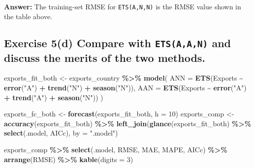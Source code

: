 \documentclass[
  11pt,
]{article}
\newenvironment{Shaded}{\begin{snugshade}}{\end{snugshade}}
\newcommand{\AttributeTok}[1]{\textcolor[rgb]{0.13,0.29,0.53}{#1}}
\newcommand{\DecValTok}[1]{\textcolor[rgb]{0.00,0.00,0.81}{#1}}
\newcommand{\FunctionTok}[1]{\textcolor[rgb]{0.13,0.29,0.53}{\textbf{#1}}}
\newcommand{\NormalTok}[1]{#1}
\newcommand{\OtherTok}[1]{\textcolor[rgb]{0.56,0.35,0.01}{#1}}
\newcommand{\SpecialCharTok}[1]{\textcolor[rgb]{0.81,0.36,0.00}{\textbf{#1}}}
\newcommand{\StringTok}[1]{\textcolor[rgb]{0.31,0.60,0.02}{#1}}
\begin{document}
\textbf{Answer:} The training-set RMSE for \texttt{ETS(A,N,N)} is the
RMSE value shown in the table above.

\subsection{\texorpdfstring{Exercise 5(d) Compare with
\texttt{ETS(A,A,N)} and discuss the merits of the two
methods.}{Exercise 5(d) Compare with ETS(A,A,N) and discuss the merits of the two methods.}}\label{exercise-5d-compare-with-etsaan-and-discuss-the-merits-of-the-two-methods.}

\begin{Shaded}
\begin{Highlighting}[]
\NormalTok{exports\_fit\_both }\OtherTok{\textless{}{-}}\NormalTok{ exports\_country }\SpecialCharTok{\%\textgreater{}\%}
  \FunctionTok{model}\NormalTok{(}
    \AttributeTok{ANN =} \FunctionTok{ETS}\NormalTok{(Exports }\SpecialCharTok{\textasciitilde{}} \FunctionTok{error}\NormalTok{(}\StringTok{"A"}\NormalTok{) }\SpecialCharTok{+} \FunctionTok{trend}\NormalTok{(}\StringTok{"N"}\NormalTok{) }\SpecialCharTok{+} \FunctionTok{season}\NormalTok{(}\StringTok{"N"}\NormalTok{)),}
    \AttributeTok{AAN =} \FunctionTok{ETS}\NormalTok{(Exports }\SpecialCharTok{\textasciitilde{}} \FunctionTok{error}\NormalTok{(}\StringTok{"A"}\NormalTok{) }\SpecialCharTok{+} \FunctionTok{trend}\NormalTok{(}\StringTok{"A"}\NormalTok{) }\SpecialCharTok{+} \FunctionTok{season}\NormalTok{(}\StringTok{"N"}\NormalTok{))}
\NormalTok{  )}

\NormalTok{exports\_fc\_both }\OtherTok{\textless{}{-}} \FunctionTok{forecast}\NormalTok{(exports\_fit\_both, }\AttributeTok{h =} \DecValTok{10}\NormalTok{)}
\NormalTok{exports\_comp }\OtherTok{\textless{}{-}} \FunctionTok{accuracy}\NormalTok{(exports\_fit\_both) }\SpecialCharTok{\%\textgreater{}\%}
  \FunctionTok{left\_join}\NormalTok{(}\FunctionTok{glance}\NormalTok{(exports\_fit\_both) }\SpecialCharTok{\%\textgreater{}\%} \FunctionTok{select}\NormalTok{(.model, AICc), }\AttributeTok{by =} \StringTok{".model"}\NormalTok{)}

\NormalTok{exports\_comp }\SpecialCharTok{\%\textgreater{}\%}
  \FunctionTok{select}\NormalTok{(.model, RMSE, MAE, MAPE, AICc) }\SpecialCharTok{\%\textgreater{}\%}
  \FunctionTok{arrange}\NormalTok{(RMSE) }\SpecialCharTok{\%\textgreater{}\%}
  \FunctionTok{kable}\NormalTok{(}\AttributeTok{digits =} \DecValTok{3}\NormalTok{)}
\end{Highlighting}
\end{Shaded}
\end{document}
